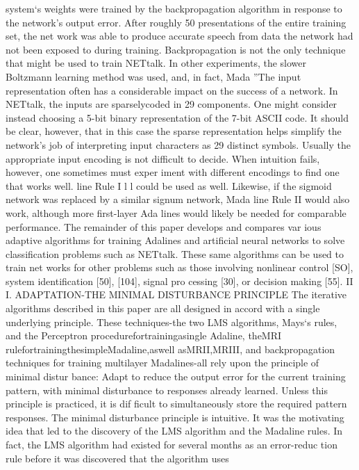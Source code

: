 \documentclass[11pt,a4paper,twocolumn]{article}
\begin{document}
system‘s weights were trained by the backpropagation 
algorithm in response to the network’s output error. After 
roughly 50 presentations of the entire training set, the net
work was able to produce accurate speech from data the 
network had not been exposed to during training. 
Backpropagation is not the only technique that might be 
used to train NETtalk. In other experiments, the slower 
Boltzmann learning method was used, and, in fact, Mada
”The input representation often has a considerable impact on 
the success of a network. In NETtalk, the inputs are sparselycoded 
in 29 components. One might consider instead choosing a 5-bit 
binary representation of the 7-bit ASCII code. It should be clear, 
however, that in this case the sparse representation helps simplify 
the network’s job of interpreting input characters as 29 distinct 
symbols. Usually the appropriate input encoding is not difficult to 
decide. When intuition fails, however, one sometimes must exper
iment with different encodings to find one that works well. 
line Rule I l l  could be used as well. Likewise, if the sigmoid 
network was replaced by a similar signum network, Mada
line Rule II would also work, although more first-layer Ada
lines would likely be needed for comparable performance. 
The remainder of this paper develops and compares var
ious adaptive algorithms for training Adalines and artificial 
neural networks to solve classification problems such as 
NETtalk. These same algorithms can be used to train net
works for other problems such as those involving nonlinear 
control [SO], system identification [50], [104], signal pro
cessing [30], or decision making [55]. 
II I. ADAPTATION-THE MINIMAL 
DISTURBANCE 
PRINCIPLE 
The iterative algorithms described in this paper are all 
designed in accord with a single underlying principle. These 
techniques-the two LMS algorithms, Mays‘s rules, and the 
Perceptron procedurefortrainingasingle Adaline, theMRI 
rulefortrainingthesimpleMadaline,aswell asMRII,MRIII, 
and backpropagation techniques for training multilayer 
Madalines-all rely upon the principle of minimal distur
bance: Adapt to reduce the output error for the current 
training pattern, with minimal disturbance to responses 
already learned. Unless this principle is practiced, it is dif
ficult to simultaneously store the required pattern 
responses. The minimal disturbance principle is intuitive. 
It was the motivating idea that led to the discovery of the 
LMS algorithm and the Madaline rules. In fact, the LMS 
algorithm had existed for several months as an error-reduc
tion rule before it was discovered that the algorithm uses 
\end{document}
